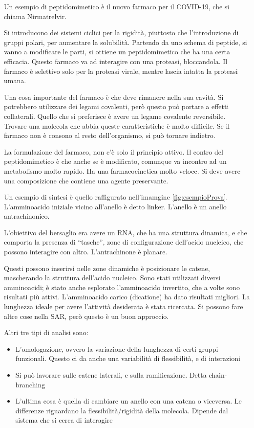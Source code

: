 Un esempio di peptidomimetico è il nuovo farmaco per il COVID-19, che si chiama
Nirmatrelvir.


Si introducono dei sistemi ciclici per la rigidità, piuttosto che
l'introduzione di gruppi polari, per aumentare la solubilità.
Partendo da uno schema di peptide, si vanno a modificare le parti, si
ottiene un peptidomimetico che ha una certa efficacia.
Questo farmaco va ad interagire con una proteasi, bloccandola. Il farmaco è selettivo solo per la proteasi virale, mentre lascia intatta la proteasi umana.

Una cosa importante del farmaco è che deve rimanere nella sua cavità. Si
potrebbero utilizzare dei legami covalenti, però questo può portare a
effetti collaterali. Quello che si preferisce è avere un legame
covalente reversibile.
Trovare una molecola che abbia queste caratteristiche è molto difficile.
Se il farmaco non è consono al resto dell'organismo, si può tornare
indietro.

La formulazione del farmaco, non c'è solo il principio attivo. Il contro
del peptidomimetico è che anche se è modificato, comunque va incontro ad
un metabolismo molto rapido. Ha una farmacocinetica molto veloce.
Si deve avere una composizione che contiene una agente preservante.


Un esempio di sintesi è quello raffigurato nell'imamgine \ref{fig:esempioProva}. L'amminoacido iniziale vicino all'anello è detto linker. L'anello è un
anello antrachinonico.


L'obiettivo del bersaglio era avere un RNA, che ha una struttura
dinamica, e che comporta la presenza di ``tasche'', zone di
configurazione dell'acido nucleico, che possono interagire con altro.
L'antrachinone è planare.

Questi possono inserirsi nelle zone dinamiche è posizionare le catene,
mascherando la struttura dell'acido nucleico.
Sono stati utilizzati diversi amminoacidi; è stato anche esplorato
l'amminoacido invertito, che a volte sono risultati più attivi.
L'amminoacido carico (dicatione) ha dato risultati migliori. La
lunghezza ideale per avere l'attività desiderata è stata ricercata.
Si possono fare altre cose nella SAR, però questo è un buon approccio.

Altri tre tipi di analisi sono:
\begin{itemize}
  \item
  L'omologazione, ovvero la variazione
  della lunghezza di certi gruppi funzionali. Questo ci da anche una
  variabilità di flessibilità, e di interazioni 
  \item
  Si può lavorare sulle
  catene laterali, e sulla ramificazione. Detta chain-branching
  \item 
  L'ultima
  cosa è quella di cambiare un anello con una catena o viceversa. Le
  differenze riguardano la flessibilità/rigidità della molecola. Dipende
  dal sistema che si cerca di interagire
\end{itemize}

